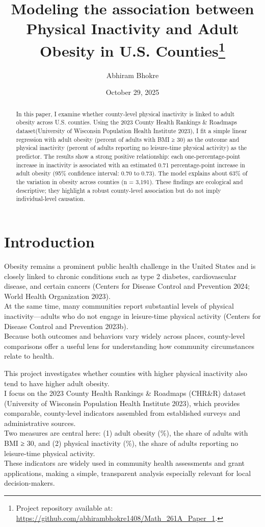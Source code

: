 \documentclass[
  letterpaper,
  DIV=11,
  numbers=noendperiod]{scrartcl}
\title{Modeling the association between Physical Inactivity and Adult
Obesity in U.S. Counties\thanks{Project repository available at:
\url{https://github.com/abhirambhokre1408/Math_261A_Paper_1}.}}
\author{Abhiram Bhokre}
\date{October 29, 2025}
\begin{document}
\maketitle
\begin{abstract}
In this paper, I examine whether county-level physical inactivity is
linked to adult obesity across U.S. counties. Using the 2023 County
Health Rankings \& Roadmaps dataset(University of Wisconsin Population
Health Institute 2023), I fit a simple linear regression with adult
obesity (percent of adults with BMI ≥ 30) as the outcome and physical
inactivity (percent of adults reporting no leisure-time physical
activity) as the predictor. The results show a strong positive
relationship: each one-percentage-point increase in inactivity is
associated with an estimated 0.71 percentage-point increase in adult
obesity (95\% confidence interval: 0.70 to 0.73). The model explains
about 63\% of the variation in obesity across counties (n = 3,191).
These findings are ecological and descriptive; they highlight a robust
county-level association but do not imply individual-level causation.
\end{abstract}


\section{Introduction}\label{introduction}

Obesity remains a prominent public health challenge in the United States
and is closely linked to chronic conditions such as type 2 diabetes,
cardiovascular disease, and certain cancers (Centers for Disease Control
and Prevention 2024; World Health Organization 2023).\\
At the same time, many communities report substantial levels of physical
inactivity---adults who do not engage in leisure-time physical activity
(Centers for Disease Control and Prevention 2023b).\\
Because both outcomes and behaviors vary widely across places,
county-level comparisons offer a useful lens for understanding how
community circumstances relate to health.

This project investigates whether counties with higher physical
inactivity also tend to have higher adult obesity.\\
I focus on the 2023 County Health Rankings \& Roadmaps (CHR\&R) dataset
(University of Wisconsin Population Health Institute 2023), which
provides comparable, county-level indicators assembled from established
surveys and administrative sources.\\
Two measures are central here: (1) adult obesity (\%), the share of
adults with BMI ≥ 30, and (2) physical inactivity (\%), the share of
adults reporting no leisure-time physical activity.\\
These indicators are widely used in community health assessments and
grant applications, making a simple, transparent analysis especially
relevant for local decision-makers.
\end{document}
